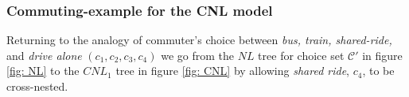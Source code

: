 

\subsubsection{Commuting-example for the CNL model}
\label{sec: CNL_example}
Returning to the analogy of commuter's choice between \textit{bus, train, shared-ride,} and \textit{drive alone} $(c_1,c_2,c_3,c_4)$ we go from the $NL$ tree for choice set $\mathcal{C'}$ in figure \ref{fig: NL} to the $CNL_1$ tree in figure \ref{fig: CNL} by allowing \textit{shared ride}, $c_4$, to be cross-nested.

